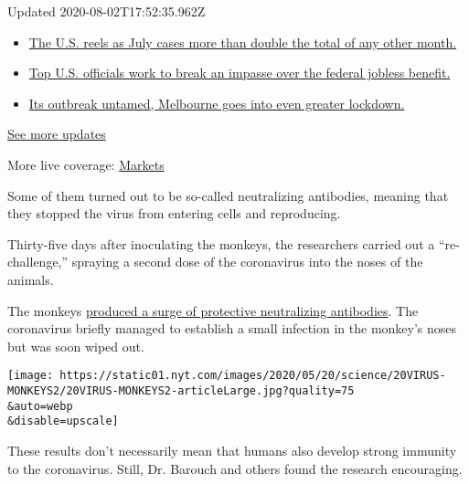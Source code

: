Updated 2020-08-02T17:52:35.962Z

\begin{itemize}
\tightlist
\item
  \href{https://www.nytimes.com/2020/08/01/world/coronavirus-covid-19.html?action=click\&pgtype=Article\&state=default\&region=MAIN_CONTENT_1\&context=storylines_live_updates\#link-34047410}{The
  U.S. reels as July cases more than double the total of any other
  month.}
\item
  \href{https://www.nytimes.com/2020/08/01/world/coronavirus-covid-19.html?action=click\&pgtype=Article\&state=default\&region=MAIN_CONTENT_1\&context=storylines_live_updates\#link-780ec966}{Top
  U.S. officials work to break an impasse over the federal jobless
  benefit.}
\item
  \href{https://www.nytimes.com/2020/08/01/world/coronavirus-covid-19.html?action=click\&pgtype=Article\&state=default\&region=MAIN_CONTENT_1\&context=storylines_live_updates\#link-2bc8948}{Its
  outbreak untamed, Melbourne goes into even greater lockdown.}
\end{itemize}

\href{https://www.nytimes.com/2020/08/01/world/coronavirus-covid-19.html?action=click\&pgtype=Article\&state=default\&region=MAIN_CONTENT_1\&context=storylines_live_updates}{See
more updates}

More live coverage:
\href{https://www.nytimes.com/live/2020/07/31/business/stock-market-today-coronavirus?action=click\&pgtype=Article\&state=default\&region=MAIN_CONTENT_1\&context=storylines_live_updates}{Markets}

Some of them turned out to be so-called neutralizing antibodies, meaning
that they stopped the virus from entering cells and reproducing.

Thirty-five days after inoculating the monkeys, the researchers carried
out a ``re-challenge,'' spraying a second dose of the coronavirus into
the noses of the animals.

The monkeys
\href{https://science.sciencemag.org/content/early/2020/05/19/science.abc4776}{produced
a surge of protective neutralizing antibodies}. The coronavirus briefly
managed to establish a small infection in the monkey's noses but was
soon wiped out.

\texttt{[image: https://static01.nyt.com/images/2020/05/20/science/20VIRUS-MONKEYS2/20VIRUS-MONKEYS2-articleLarge.jpg?quality=75\\\&auto=webp\\\&disable=upscale]}

These results don't necessarily mean that humans also develop strong
immunity to the coronavirus. Still, Dr. Barouch and others found the
research encouraging.

